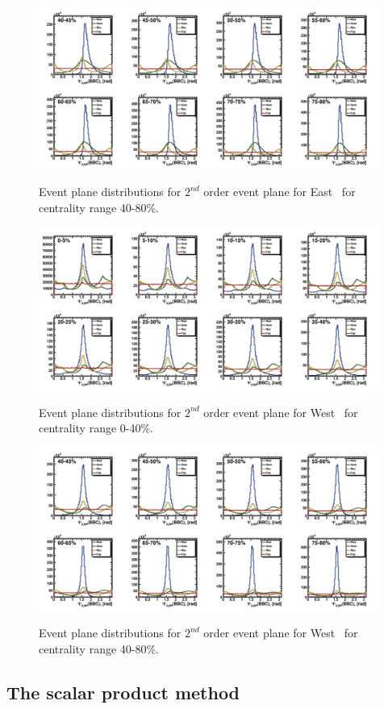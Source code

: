 \begin{figure}[ht]
    \includegraphics[width=0.99\textwidth]{Figures/PsiEast_harm1_1.png}
    \label{fig:BBC_East_EP2}
    \caption{Event plane distributions for $2^{nd}$ order event plane for East \BBC\ for centrality range 40-80\%.}
\end{figure}

\begin{figure}[ht]
    \includegraphics[width=0.99\textwidth]{Figures/PsiWest_harm1_0.png}
    \label{fig:BBC_West_EP1}
    \caption{Event plane distributions for $2^{nd}$ order event plane for West \BBC\ for centrality range 0-40\%.}
\end{figure}

\begin{figure}[ht]
    \includegraphics[width=0.99\textwidth]{Figures/PsiWest_harm1_1.png}
    \label{fig:BBC_West_EP2}
    \caption{Event plane distributions for $2^{nd}$ order event plane for West \BBC\ for centrality range 40-80\%.}
\end{figure}

\FloatBarrier
\subsection{The scalar product method}